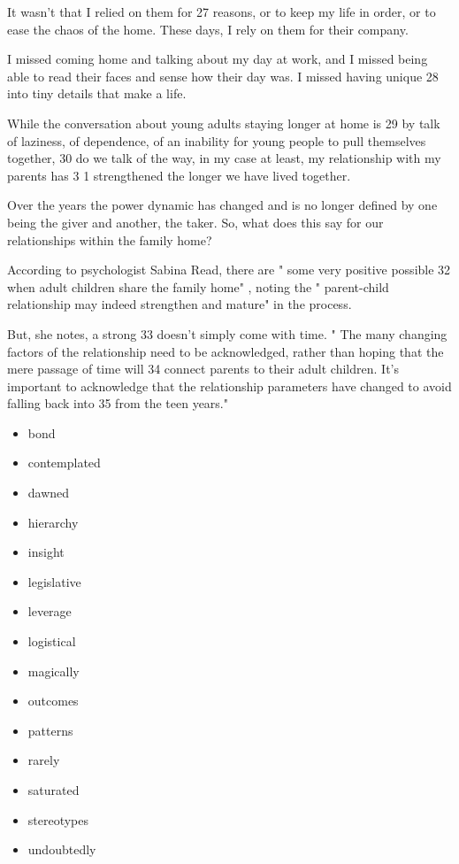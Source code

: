 \documentclass[UTF8,11pt]{ctexart}
\begin{document}
It wasn't that I relied on them for 27 reasons, or to keep my life in order, or to ease the chaos of the home. These days, I rely on them for their company.


I missed coming home and talking about my day at work, and I missed being able to read their faces and sense how their day was. I missed having unique 28 into tiny details that make a life.


While the conversation about young adults staying longer at home is 29 by talk of laziness, of dependence, of an inability for young people to pull themselves together, 30 do we talk of the way, in my case at least, my relationship with my parents has 3 1 strengthened the longer we have lived together.


Over the years the power dynamic has changed and is no longer defined by one being the giver and another, the taker. So, what does this say for our relationships within the family home?


According to psychologist Sabina Read, there are " some very positive possible 32 when adult children share the family home" , noting the " parent-child relationship may indeed strengthen and mature" in the process.


But, she notes, a strong 33 doesn't simply come with time. " The many changing factors of the relationship need to be acknowledged, rather than hoping that the mere passage of time will 34 connect parents to their adult children. It's important to acknowledge that the relationship parameters have changed to avoid falling back into 35 from the teen years."


\begin{itemize}[leftmargin=2em,itemsep=.2em,topsep=.4em]\item[A.] bond
\item[B.] contemplated
\item[C.] dawned
\item[D.] hierarchy
\item[E.] insight
\item[F.] legislative
\item[G.] leverage
\item[H.] logistical
\item[I.] magically
\item[J.] outcomes
\item[K.] patterns
\item[L.] rarely
\item[M.] saturated
\item[N.] stereotypes
\item[O.] undoubtedly
\end{itemize}
\end{document}

